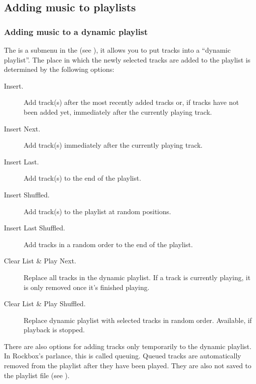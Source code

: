 \subsection{Adding music to playlists}

\subsubsection{\label{ref:currentplaylist_submenu}Adding music to a dynamic playlist}
The  is a submenu in the  (see
), it allows you to put tracks into a
``dynamic playlist''. The place in which the newly
selected tracks are added to the playlist is determined by the following
options:

\begin{description}
\item [Insert.] Add track(s) after the most recently added tracks or, if tracks
have not been added yet, immediately after the currently playing track.

\item [Insert Next.] Add track(s) immediately after the currently playing track.

\item [Insert Last.] Add track(s) to the end of the playlist.

\item [Insert Shuffled.] Add track(s) to the playlist at random positions.

\item [Insert Last Shuffled.] Add tracks in a random order to the end of the playlist.

\item [Clear List \& Play Next.] Replace all tracks in the dynamic playlist.
If a track is currently playing, it is only removed once it’s finished playing.

\item [Clear List \& Play Shuffled.] Replace dynamic playlist with selected tracks
in random order. Available, if playback is stopped.
\end{description}

There are also options for adding tracks only temporarily to the dynamic playlist.
In Rockbox’s parlance, this is called queuing. Queued tracks are automatically
removed from the playlist after they have been played. They are also not saved
to the playlist file (see ).


